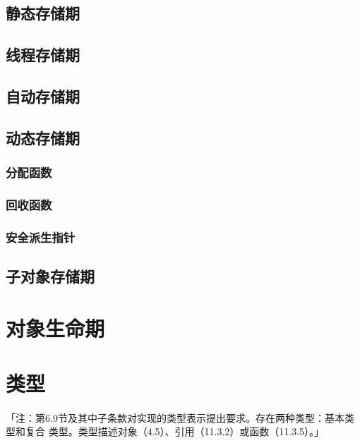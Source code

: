 \subsection{静态存储期}
\subsection{线程存储期}
\subsection{自动存储期}

\subsection{动态存储期}
\subsubsection{分配函数}
\subsubsection{回收函数}
\subsubsection{安全派生指针}

\subsection{子对象存储期}

\section{对象生命期}

\section{类型}

\paragraph{}
「注：第6.9节及其中子条款对实现的类型表示提出要求。存在两种类型：基本类型和复合
类型。类型描述对象（4.5）、引用（11.3.2）或函数（11.3.5）。」

